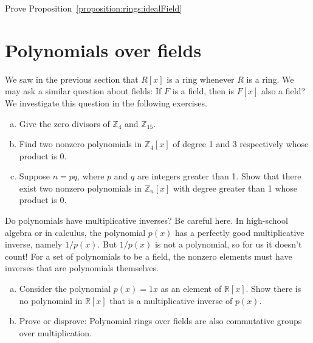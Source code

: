 \begin{exercise}\label{exercise:rings:idealField}
Prove Proposition~\ref{proposition:rings:idealField}
\end{exercise}


\section{Polynomials over fields}
\label{sec:polyOverFields}

We saw in the previous section that  $R[x]$ is a ring whenever $R$ is a ring. We may ask a similar question about fields: If $F$ is a field, then is $F[x]$ also a field? We investigate this question in the following exercises.


\begin{exercise}\label{exercise:rings:poly12}
\begin{enumerate}[(a)]
\item  Give the zero divisors of ${\mathbb Z}_4$ and ${\mathbb Z}_{15}$.
\item
Find two nonzero polynomials in $\mathbb{Z}_4[x]$ of degree 1 and 3 respectively  whose product is 0.
\item
Suppose $n=pq$, where $p$ and $q$ are integers greater than 1. Show that there exist two nonzero polynomials in $\mathbb{Z}_n[x]$ with degree greater than 1 whose product is 0.
\end{enumerate}
\end{exercise}

Do polynomials have multiplicative inverses? Be careful here. In high-school algebra or in calculus,   the polynomial $p(x)$ has a perfectly good multiplicative inverse, namely  $1/p(x)$. But $1/p(x)$ is not a polynomial, so for us it doesn't count! For a set of polynomials to be a field, the nonzero elements must have inverses that are polynomials themselves.

\begin{exercise}
\begin{enumerate}[(a)]
\item
Consider the  polynomial $p(x)= 1x$ as an element of $\mathbb{R}[x]$. Show there is no polynomial in $\mathbb{R}[x]$ that is a multiplicative inverse of $p(x)$.
\item
Prove or disprove: Polynomial rings over fields are also commutative groups over multiplication.
\end{enumerate}
\end{exercise}

